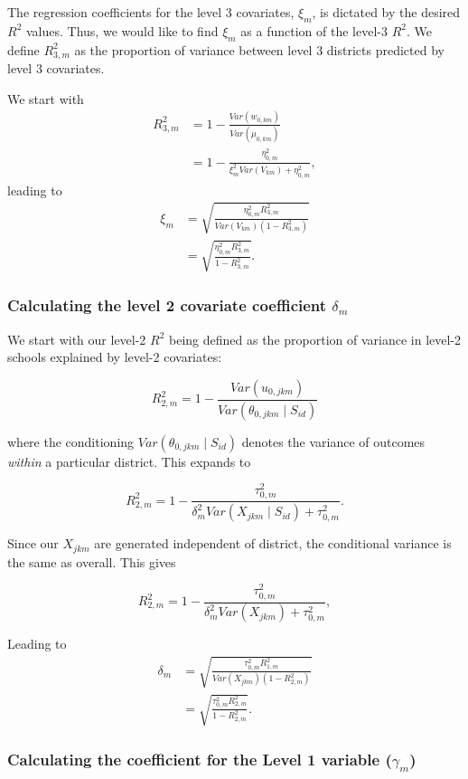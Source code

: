 \documentclass[12pt]{article}
\begin{document}
The regression coefficients for the level 3 covariates, $\xi_m$, is dictated by the desired $R^2$ values.
Thus, we would like to find $\xi_m$ as a function of the level-3 $R^2$.
We define $R^2_{3,m}$ as the proportion of variance between level 3 districts predicted by level 3 covariates.

We start with
\begin{align*}
R_{3,m}^2
&= 1 - \frac{Var(w_{0,km})}{Var(\mu_{0,km})} \\
&= 1 - \frac{\eta^2_{0,m}}{\xi_m^2 Var(V_{km}) + \eta^2_{0,m}},
\end{align*}
leading to
\begin{align*}
\xi_m  &= \sqrt{\frac{\eta^2_{0,m}R_{3,m}^2}{Var(V_{km})(1 - R_{3,m}^2)}} \\
&= \sqrt{\frac{\eta^2_{0,m}R_{3,m}^2}{1 - R_{3,m}^2}}.
\end{align*}


\subsubsection{Calculating the level 2 covariate coefficient $\delta_m$}

We start with our level-2 $R^2$ being defined as the proportion of variance in level-2 schools explained by level-2 covariates:

\[
R_{2,m}^2 = 1 - \frac{Var(u_{0,jkm})}{Var(\theta_{0,jkm} \mid S_{id})}
\]

where the conditioning $Var(\theta_{0,jkm} \mid S_{id})$ denotes the variance of outcomes \emph{within} a particular district.
This expands to

\[
R_{2,m}^2 = 1 - \frac{\tau^2_{0,m}}{\delta_m^2Var(X_{jkm} \mid S_{id}) + \tau^2_{0,m}}.
\]

Since our $X_{jkm}$ are generated independent of district, the conditional variance is the same as overall. This gives

\[
R_{2,m}^2 = 1 - \frac{\tau^2_{0,m}}{\delta_m^2Var(X_{jkm}) + \tau^2_{0,m}},
\]

Leading to
\begin{align*}
\delta_m  &= \sqrt{\frac{\tau^2_{0,m}R_{1,m}^2}{Var(X_{jkm})(1 - R_{2,m}^2)}} \\
&= \sqrt{\frac{\tau^2_{0,m}R_{2,m}^2}{1 - R_{2,m}^2}}.
\end{align*}

\subsubsection{Calculating the coefficient for the Level 1 variable ($\gamma_m$)}
\end{document}
